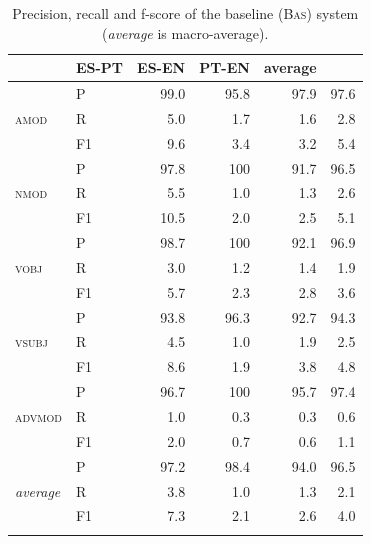 \documentclass[output=paper,modfonts,nonflat]{langsci/langscibook}
\begin{document}
\begin{table}
  \begin{center}
    \caption{\label{tab:bas} Precision, recall and f-score of the baseline (\textsc{Bas}) system (\emph{average} is macro-average).}
    \begin{tabular}{llrrrr}
      \lsptoprule
      \multicolumn{2}{l}{\textbf{Pattern}} & \textbf{ES-PT} & \textbf{ES-EN} & \textbf{PT-EN} & \textbf{average}\\
      \midrule
	\multirow{3}{*}{\textsc{amod}} & P & 99.0 & 95.8 & 97.9 & 97.6\\ 
	& R & 5.0 & 1.7 & 1.6 & 2.8\\ 
	& F1 & 9.6 & 3.4 & 3.2 & 5.4\\ \midrule
	\multirow{3}{*}{\textsc{nmod}} & P & 97.8 & 100\phantom{.0} & 91.7 & 96.5\\ 
	& R & 5.5 & 1.0 & 1.3 & 2.6\\ 
	& F1 & 10.5 & 2.0 & 2.5 & 5.1\\  \midrule
	\multirow{3}{*}{\textsc{vobj}} & P & 98.7 & 100\phantom{.0} & 92.1 & 96.9\\ 
	& R & 3.0 & 1.2 & 1.4 & 1.9\\ 
	& F1 & 5.7 & 2.3 & 2.8 & 3.6\\  \midrule
	\multirow{3}{*}{\textsc{vsubj}} & P & 93.8 & 96.3 & 92.7 & 94.3\\ 
	& R & 4.5 & 1.0 & 1.9 & 2.5\\ 
	& F1 & 8.6 & 1.9 & 3.8 & 4.8\\  \midrule
	\multirow{3}{*}{\textsc{advmod}} & P & 96.7 & 100\phantom{.0} & 95.7 & 97.4\\ 
	& R & 1.0 & 0.3 & 0.3 & 0.6\\ 
	& F1 & 2.0 & 0.7 & 0.6 & 1.1\\  \midrule
	\multirow{3}{*}{\emph{average}} & P & 97.2 & 98.4 & 94.0 & 96.5\\ 
	& R & 3.8 & 1.0 & 1.3 & 2.1\\ 
	& F1 & 7.3 & 2.1 & 2.6 & 4.0\\
      \lspbottomrule
    \end{tabular}
  \end{center}
\end{table}
\end{document}
